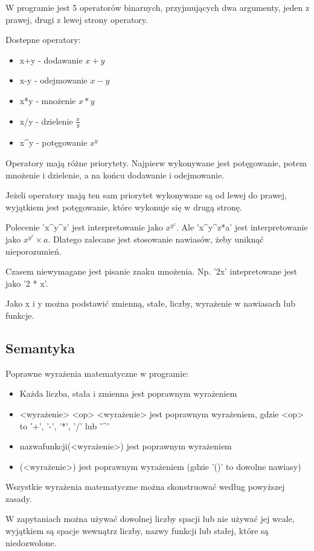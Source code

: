 \documentclass[a4paper]{article}
\begin{document}
W programie jest 5 operatorów binarnych, przyjmujących dwa argumenty, jeden z prawej, drugi z lewej strony operatory. 

Dostepne operatory:
\begin{itemize}
    \item x+y - dodawanie $x+y$
    \item x-y - odejmowanie $x-y$
    \item x*y - mnożenie $x*y$
    \item x/y - dzielenie $\frac{x}{y}$
    \item x\^{}y - potęgowanie $x^y$ 
\end{itemize}

Operatory mają różne priorytety. Najpierw wykonywane jest potęgowanie, potem mnożenie i dzielenie, a na końcu dodawanie i odejmowanie.

Jeżeli operatory mają ten sam priorytet wykonywane są od lewej do prawej, wyjątkiem jest potęgowanie, które wykonuje się w drugą stronę.

Polecenie 'x\^{}y\^{}z' jest interpretowanie jako $x^{y^z}$. 
Ale 'x\^{}y\^{}z*a' jest interpretowanie jako $x^{y^z} \times a$. Dlatego zalecane jest stosowanie nawiasów, żeby uniknąć nieporozumień.

Czasem niewymagane jest pisanie znaku mnożenia. Np. '2x' intepretowane jest jako '2 * x'.

Jako x i y można podstawić zmienną, stałe, liczby, wyrażenie w nawiasach lub funkcje.

\subsection{Semantyka}

Poprawne wyrażenia matematyczne w programie:
\begin{itemize}
    \item Każda liczba, stała i zmienna jest poprawnym wyrażeniem
    \item <wyrażenie> <op> <wyrażenie> jest poprawnym wyrażeniem, gdzie <op> to '+', '-', '*', '/' lub '\^{}'
    \item nazwafunkcji(<wyrażenie>) jest poprawnym wyrażeniem
    \item (<wyrażenie>) jest poprawnym wyrażeniem (gdzie '()' to dowolne nawiasy)
\end{itemize}

Wszystkie wyrażenia matematyczne można skonstruować według powyższej zasady.

W zapytaniach można używać dowolnej liczby spacji lub nie używać jej wcale, wyjątkiem są spacje wewnątrz liczby, nazwy funkcji lub stałej, które są niedozwolone.
\end{document}
